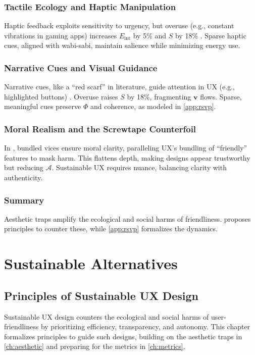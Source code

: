 \documentclass[openany]{book}
\newcommand{\PhiS}{\Phi} %
\newcommand{\vvec}{\mathbf{v}} %
\newcommand{\Sent}{S} %
\newcommand{\Eint}{E_{\mathrm{int}}} %
\newcommand{\Auton}{\mathcal{A}} %
\begin{document}
\section{Tactile Ecology and Haptic Manipulation}
\label{sec:tactile-ecology}
Haptic feedback exploits sensitivity to urgency, but overuse (e.g., constant vibrations in gaming apps) increases $\Eint$ by 5\% and $\Sent$ by 18\% \citep{gallace2006}. Sparse haptic cues, aligned with wabi-sabi, maintain salience while minimizing energy use.

\section{Narrative Cues and Visual Guidance}
\label{sec:narrative-cues}
Narrative cues, like a \enquote{red scarf} in literature, guide attention in UX (e.g., highlighted buttons) \citep{lewis1942}. Overuse raises $\Sent$ by 18\%, fragmenting $\vvec$ flows. Sparse, meaningful cues preserve $\PhiS$ and coherence, as modeled in \cref{app:rsvp}.

\section{Moral Realism and the Screwtape Counterfoil}
\label{sec:screwtape}
In \citet{lewis1942}, bundled vices ensure moral clarity, paralleling UX’s bundling of \enquote{friendly} features to mask harm. This flattens depth, making designs appear trustworthy but reducing $\Auton$. Sustainable UX requires nuance, balancing clarity with authenticity.

\section{Summary}
Aesthetic traps amplify the ecological and social harms of friendliness.  proposes principles to counter these, while \cref{app:rsvp} formalizes the dynamics.

\part{Sustainable Alternatives}

\chapter{Principles of Sustainable UX Design}
\label{ch:principles}

Sustainable UX design counters the ecological and social harms of user-friendliness by prioritizing efficiency, transparency, and autonomy. This chapter formalizes principles to guide such designs, building on the aesthetic traps in \cref{ch:aesthetic} and preparing for the metrics in \cref{ch:metrics}.
\end{document}
